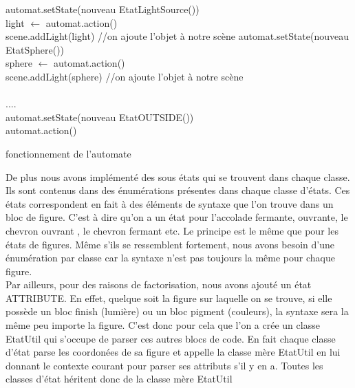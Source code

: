 \documentclass[../../Rapport RayTracer]{subfiles}
\begin{document}
\begin{algorithm}[H]
\DontPrintSemicolon
{}
{
	{
		{
			{
				automat.setState(nouveau EtatLightSource())\hfill\\
				light $\gets$ automat.action()\hfill\\
				scene.addLight(light) //on ajoute l'objet à notre scène
			}
			{
				automat.setState(nouveau EtatSphere())\hfill\\
				sphere $\gets$ automat.action()\hfill\\
				scene.addLight(sphere) //on ajoute l'objet à notre scène\hfill\\
			}
			\hfill\\
			....
			\hfill\\
			{
				automat.setState(nouveau EtatOUTSIDE())\hfill\\
				automat.action()\hfill\\
			}
		}
	}
}
\caption{fonctionnement de l'automate}
\label{exempleAutomat}
\end{algorithm}


De plus nous avons implémenté des sous états qui se trouvent dans chaque classe. Ils sont contenus dans des énumérations présentes dans chaque classe d'états. Ces états correspondent en fait à des éléments de syntaxe que l'on trouve dans un bloc de figure. C'est à dire qu'on a un état pour l'accolade fermante, ouvrante, le chevron ouvrant , le chevron fermant etc.
Le principe est le même que pour les états de figures. Même s'ils se ressemblent fortement, nous avons besoin d'une énumération par classe car la syntaxe n'est pas toujours la même pour chaque figure.
\\

Par ailleurs, pour des raisons de factorisation, nous avons ajouté un état ATTRIBUTE. En effet, quelque soit la figure sur laquelle on se trouve, si elle possède un bloc finish (lumière) ou un bloc pigment (couleurs), la syntaxe sera la même peu importe la figure. C'est donc pour cela que l'on a crée un classe EtatUtil qui s'occupe de parser ces autres blocs de code. En fait chaque classe d'état parse les coordonées de sa figure et appelle la classe mère EtatUtil en lui donnant le contexte courant pour parser ses attributs s'il y en a. Toutes les classes d'état héritent donc de la classe mère EtatUtil
\end{document}
